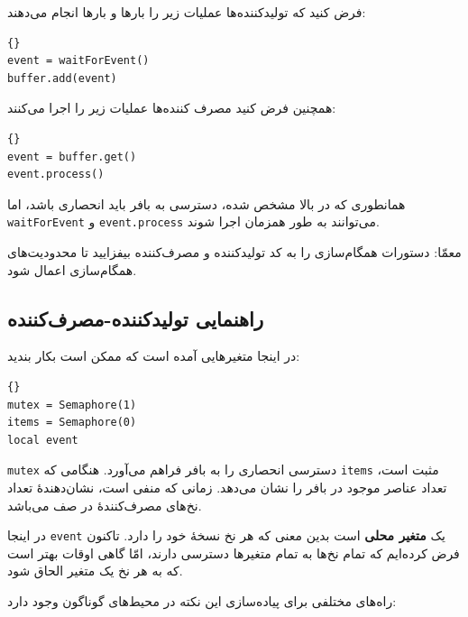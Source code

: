 \documentclass{book}
\newcommand{\clearemptydoublepage}{\newpage\cleardoublepage}
\begin{document}
    فرض کنید که تولیدکننده‌ها عملیات زیر را بارها و بارها انجام می‌دهند:

\begin{latin}
\begin{lstlisting}[title=\rl{کد پایهٔ تولیدکننده}]{}
event = waitForEvent()
buffer.add(event)
\end{lstlisting}
\end{latin}

    همچنین فرض کنید مصرف کننده‌ها عملیات زیر را اجرا می‌کنند:

\begin{latin}
\begin{lstlisting}[title=\rl{کد پایهٔ مصرف‌کننده}]{}
event = buffer.get()
event.process()
\end{lstlisting}
\end{latin}

    همانطوری که در بالا مشخص شده، دسترسی به بافر باید انحصاری باشد، 
    اما {\tt waitForEvent} و {\tt event.process} می‌توانند به طور همزمان اجرا شوند.
    

    معمّا: دستورات همگام‌سازی را به کد تولید‌کننده و مصرف‌کننده بیفزایید تا محدودیت‌های همگام‌سازی اعمال شود.

\clearemptydoublepage
\subsection{راهنمایی تولیدکننده-مصرف‌کننده}

    در اینجا متغیرهایی آمده است که ممکن است بکار بندید:

\begin{latin}
\begin{lstlisting}[title=\rl{مقداردهی اولیه تولیدکننده-مصرف‌کننده}]{}
mutex = Semaphore(1)
items = Semaphore(0)
local event
\end{lstlisting}
\end{latin}

    {\tt mutex} دسترسی انحصاری را به بافر فراهم می‌آورد. 
    هنگامی که {\tt items} مثبت است، تعداد عناصر موجود در بافر را نشان می‌دهد. 
    زمانی که منفی است، نشان‌دهندهٔ تعداد نخ‌های مصرف‌کنندهٔ در صف می‌باشد. 

    در اینجا {\tt event}
    یک \textbf{متغیر محلی} است بدین معنی که هر نخ نسخهٔ خود را دارد.
    تاکنون فرض کرده‌ایم که تمام نخ‌ها به تمام متغیرها دسترسی دارند، امّا گاهی اوقات بهتر است که به هر نخ یک متغیر الحاق شود.

    راه‌های مختلفی برای پیاده‌سازی این نکته در محیط‌های گوناگون وجود دارد:
    
\end{document}
